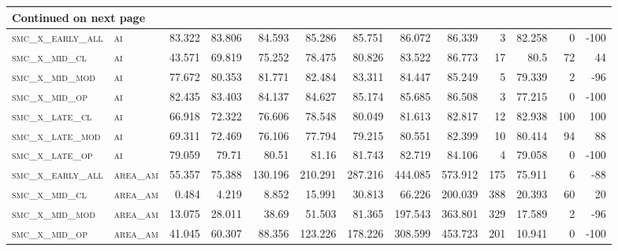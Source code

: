 \begin{landscape}
\begin{center}
\begin{footnotesize}
\begin{longtable}{llrrrrrrrr|rrr}
\hline \multicolumn{13}{|l|}{{Continued on next page}} \\ \hline
\endfoot

\hline \hline
\endlastfoot

\textsc{smc\_x\_early\_all} & \textsc{ai        }   & 83.322   & 83.806   & 84.593   & 85.286   & 85.751   & 86.072   & 86.339   & 3      & 82.258        & 0             & -100            \\
\textsc{smc\_x\_mid\_cl   } & \textsc{ai        }   & 43.571   & 69.819   & 75.252   & 78.475   & 80.826   & 83.522   & 86.773   & 17     & 80.5          & 72            & 44              \\
\textsc{smc\_x\_mid\_mod  } & \textsc{ai        }   & 77.672   & 80.353   & 81.771   & 82.484   & 83.311   & 84.447   & 85.249   & 5      & 79.339        & 2             & -96             \\
\textsc{smc\_x\_mid\_op   } & \textsc{ai        }   & 82.435   & 83.403   & 84.137   & 84.627   & 85.174   & 85.685   & 86.508   & 3      & 77.215        & 0             & -100            \\
\textsc{smc\_x\_late\_cl  } & \textsc{ai        }   & 66.918   & 72.322   & 76.606   & 78.548   & 80.049   & 81.613   & 82.817   & 12     & 82.938        & 100           & 100             \\
\textsc{smc\_x\_late\_mod } & \textsc{ai        }   & 69.311   & 72.469   & 76.106   & 77.794   & 79.215   & 80.551   & 82.399   & 10     & 80.414        & 94            & 88              \\
\textsc{smc\_x\_late\_op  } & \textsc{ai        }   & 79.059   & 79.71    & 80.51    & 81.16    & 81.743   & 82.719   & 84.106   & 4      & 79.058        & 0             & -100            \\
\textsc{smc\_x\_early\_all} & \textsc{area\_am  }   & 55.357   & 75.388   & 130.196  & 210.291  & 287.216  & 444.085  & 573.912  & 175    & 75.911        & 6             & -88             \\
\textsc{smc\_x\_mid\_cl   } & \textsc{area\_am  }   & 0.484    & 4.219    & 8.852    & 15.991   & 30.813   & 66.226   & 200.039  & 388    & 20.393        & 60            & 20              \\
\textsc{smc\_x\_mid\_mod  } & \textsc{area\_am  }   & 13.075   & 28.011   & 38.69    & 51.503   & 81.365   & 197.543  & 363.801  & 329    & 17.589        & 2             & -96             \\
\textsc{smc\_x\_mid\_op   } & \textsc{area\_am  }   & 41.045   & 60.307   & 88.356   & 123.226  & 178.226  & 308.599  & 453.723  & 201    & 10.941        & 0             & -100            \\

\end{longtable}
\end{footnotesize}
\end{center}
\end{landscape}
